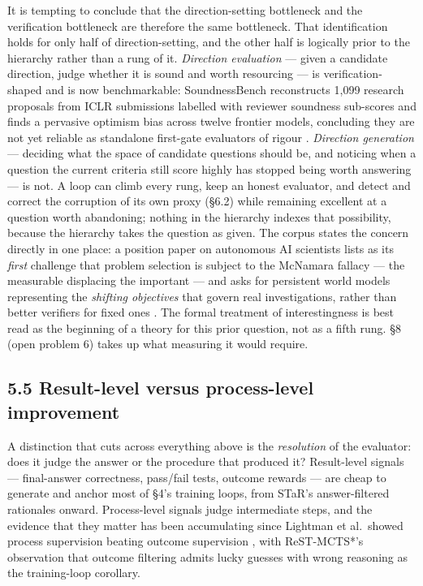 \documentclass[
  11pt,
]{article}
\begin{document}
It is tempting to conclude that the direction-setting bottleneck and the
verification bottleneck are therefore the same bottleneck. That
identification holds for only half of direction-setting, and the other
half is logically prior to the hierarchy rather than a rung of it.
\emph{Direction evaluation} --- given a candidate direction, judge
whether it is sound and worth resourcing --- is verification-shaped and
is now benchmarkable: SoundnessBench reconstructs 1,099 research
proposals from ICLR submissions labelled with reviewer soundness
sub-scores and finds a pervasive optimism bias across twelve frontier
models, concluding they are not yet reliable as standalone first-gate
evaluators of rigour \citep{ho2026soundnessbench}. \emph{Direction
generation} --- deciding what the space of candidate questions should
be, and noticing when a question the current criteria still score highly
has stopped being worth answering --- is not. A loop can climb every
rung, keep an honest evaluator, and detect and correct the corruption of
its own proxy (§6.2) while remaining excellent at a question worth
abandoning; nothing in the hierarchy indexes that possibility, because
the hierarchy takes the question as given. The corpus states the concern
directly in one place: a position paper on autonomous AI scientists
lists as its \emph{first} challenge that problem selection is subject to
the McNamara fallacy --- the measurable displacing the important --- and
asks for persistent world models representing the \emph{shifting
objectives} that govern real investigations, rather than better
verifiers for fixed ones \citep{bisht2026agentic}. The formal treatment
of interestingness \citep{herrmann2026interestingness} is best read as
the beginning of a theory for this prior question, not as a fifth rung.
§8 (open problem 6) takes up what measuring it would require.

\subsection{5.5 Result-level versus process-level
improvement}\label{result-level-versus-process-level-improvement}

A distinction that cuts across everything above is the \emph{resolution}
of the evaluator: does it judge the answer or the procedure that
produced it? Result-level signals --- final-answer correctness,
pass/fail tests, outcome rewards --- are cheap to generate and anchor
most of §4's training loops, from STaR's answer-filtered rationales
\citep{zelikman2022star} onward. Process-level signals judge
intermediate steps, and the evidence that they matter has been
accumulating since Lightman et al.~showed process supervision beating
outcome supervision \citep{lightman2023verify}, with ReST-MCTS*'s
observation that outcome filtering admits lucky guesses with wrong
reasoning \citep{zhang2024rest} as the training-loop corollary.
\end{document}
